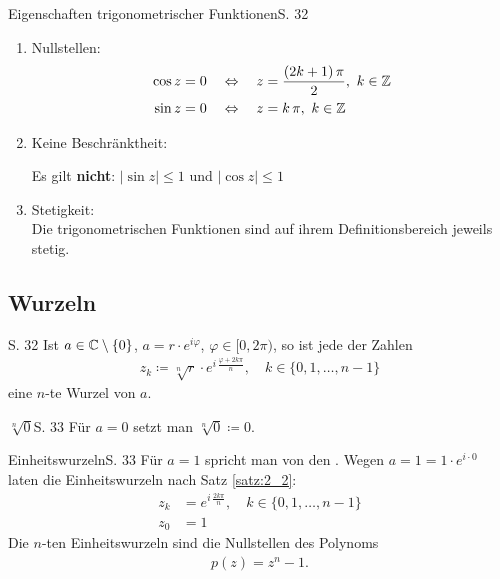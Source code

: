 \begin{bemerkung}{Eigenschaften trigonometrischer Funktionen}{S. 32}
\begin{enumerate}
      \begin{center}
        \vspace{-\baselineskip}
        $\cos z$ und $\sin z$ sind $2\pi$-periodisch.
      \end{center}
    \item Nullstellen:
      \begin{align}
        \cos z = 0 \quad &\Leftrightarrow \quad z = \frac{(2k + 1) \, \pi}{2}, \ k \in \mathbb{Z}\\
        \sin z = 0 \quad &\Leftrightarrow \quad z = k \, \pi, \ k \in \mathbb{Z}
      \end{align}
    \item Keine Beschränktheit:\\
      \begin{center}
        \vspace{-\baselineskip}
        Es gilt \textbf{nicht}: $|\sin z| \leq 1$ und $|\cos z| \leq 1$
      \end{center}
    \item Stetigkeit:\\
      Die trigonometrischen Funktionen sind auf ihrem Definitionsbereich jeweils stetig.
  \end{enumerate}
\end{bemerkung}



\subsection{Wurzeln}

\begin{satz}[$n$-te Wurzeln]{S. 32}
  \label{satz:2_2}
  Ist $a \in \mathbb{C}\setminus\{0\}$, $a = r \cdot e^{i\varphi}$, $\varphi \in [0, 2\pi)$, so ist jede der Zahlen
  \begin{align}
    z_k \coloneqq \sqrt[n]{r} \cdot e^{i \, \frac{\varphi + 2k\pi}{n}}, \quad k \in \{ 0, 1, \dots, n-1 \}
  \end{align}
  eine $n$-te Wurzel von $a$.
\end{satz}

\begin{bemerkung}{$\sqrt[n]{0}$}{S. 33}
  Für $a = 0$ setzt man $\sqrt[n]{0} \coloneqq 0$.
\end{bemerkung}

\begin{bemerkung}{Einheitswurzeln}{S. 33}
  Für $a = 1$ spricht man von den . Wegen $a = 1 = 1 \cdot e^{i \cdot 0}$ laten die Einheitswurzeln nach Satz \ref{satz:2_2}:
  \begin{align}
    z_k &= e^{i \, \frac{2k\pi}{n}}, \quad k \in \{ 0, 1, \dots, n-1 \}\\
    z_0 &= 1
  \end{align}
  Die $n$-ten Einheitswurzeln sind die Nullstellen des Polynoms
  \begin{align}
    p(z) = z^n - 1 .
  \end{align}
\end{bemerkung}

